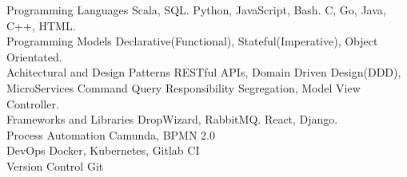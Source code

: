 

\begin{cvskills}
  \cvskill
    {Programming Languages} %
    {  Scala, SQL.} 
  \cvskill
    {} %
    {  Python, JavaScript, Bash. } 
  \cvskill
    {} %
    {  C, Go, Java, C++, HTML.} 
  \\
  \cvskill
    {Programming Models} %
    { Declarative(Functional), Stateful(Imperative), Object Orientated.} 
  \\
  \cvskill
    {Achitectural and Design Patterns} %
    {  RESTful APIs, Domain Driven Design(DDD), MicroServices}
    \cvskill
    {} %
    {  Command Query Responsibility Segregation, Model View Controller.} 
  \\
  \cvskill
    {Frameworks and Libraries} %
    {  DropWizard, RabbitMQ.} 
  \cvskill
    {} %
    {  React, Django.} 
  \\
  \cvskill
    {Process Automation}
    { Camunda, BPMN 2.0}
  \\
  \cvskill
    {DevOps} %
    { Docker, Kubernetes, Gitlab CI} %
  \\
  \cvskill
  {Version Control} %
  { Git} %

\end{cvskills}
